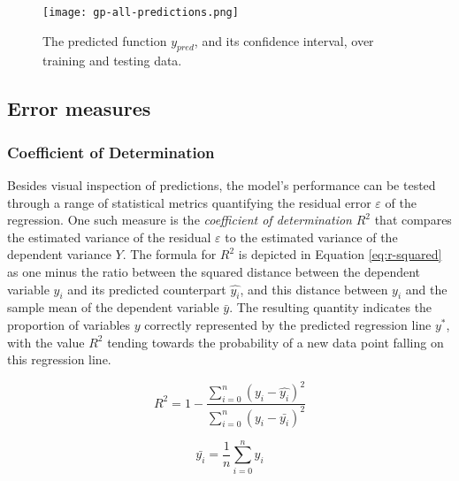 \documentclass[a4paper, 11pt]{article}
\begin{document}
    \begin{figure}[ht]
        \centering
        \caption{\centering The predicted function $y_{pred}$, and its confidence interval, over training and testing data.}
        \texttt{[image: gp-all-predictions.png]}
        \label{fig:predictions}
    \end{figure}

    \subsection{Error measures}

    \subsubsection{Coefficient of Determination}

    Besides visual inspection of predictions, the model's performance can be tested through a range of statistical metrics quantifying the residual error $\varepsilon$ of the regression. One such measure is the \emph{coefficient of determination} $R^2$ that compares the estimated variance of the residual $\varepsilon$ to the estimated variance of the dependent variance $Y$. The formula for $R^2$ is depicted in Equation \ref{eq:r-squared} as one minus the ratio between the squared distance between the dependent variable $y_i$ and its predicted counterpart $\hat{y_i}$, and this distance between $y_i$ and the sample mean of the dependent variable $\bar{y}$. The resulting quantity indicates the proportion of variables $y$ correctly represented by the predicted regression line $y^*$, with the value $R^2$ tending towards the probability of a new data point falling on this regression line.

    \begin{equation}
        R^2 = 1 - \frac{\sum_{i=0}^n (y_i - \hat{y_i})^2}{\sum_{i=0}^n (y_i - \bar{y_i})^2}
        \label{eq:r-squared}
    \end{equation}

    \begin{equation}
        \bar{y_i} = \frac{1}{n} \sum_{i=0}^n y_i
        \label{eq:mean}
    \end{equation}
\end{document}
